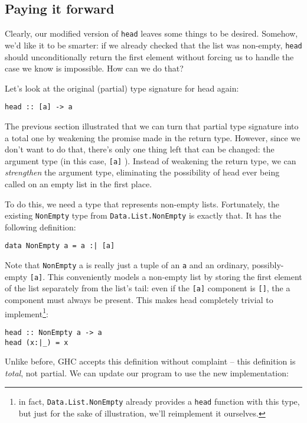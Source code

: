 \subsection{Paying it forward}


Clearly, our modified version of \texttt{head} leaves some things to be desired. Somehow, we'd like it to be smarter: if we already checked that the list was non-empty, \texttt{head} should unconditionally return the first element without forcing us to handle the case we know is impossible. How can we do that?

Let's look at the original (partial) type signature for head again:

\begin{verbatim}
head :: [a] -> a
\end{verbatim}
The previous section illustrated that we can turn that partial type signature into a total one by weakening the promise made in the return type. However, since we don't want to do that, there's only one thing left that can be changed: the argument type (in this case, \texttt{[a]} ). Instead of weakening the return type, we can \textit{strengthen} the argument type, eliminating the possibility of head ever being called on an empty list in the first place.

To do this, we need a type that represents non-empty lists. Fortunately, the existing \texttt{NonEmpty} type from \texttt{Data.List.NonEmpty} is exactly that. It has the following definition:

\begin{verbatim}
data NonEmpty a = a :| [a]
\end{verbatim}
Note that \texttt{NonEmpty} a is really just a tuple of an \texttt{a} and an ordinary, possibly-empty \texttt{[a]}. This conveniently models a non-empty list by storing the first element of the list separately from the list's tail: even if the \texttt{[a]} component is \texttt{[]}, the a component must always be present. This makes head completely trivial to implement\footnote{in fact, \texttt{Data.List.NonEmpty} already provides a \texttt{head} function with this type, but just for the sake of illustration, we'll reimplement it ourselves.}:

\begin{verbatim}
head :: NonEmpty a -> a
head (x:|_) = x
\end{verbatim}
Unlike before, GHC accepts this definition without complaint -- this definition is \textit{total}, not partial. We can update our program to use the new implementation:

